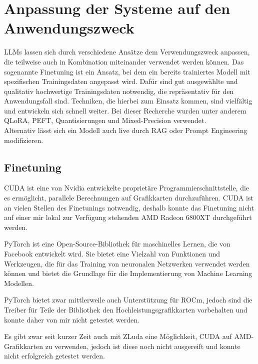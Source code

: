 \documentclass[german,report]{i1thesis}
\begin{document}
\newpage
\section{Anpassung der Systeme auf den Anwendungszweck}%
\label{sec:anpassungen-systeme}

\acp{LLM} lassen sich durch verschiedene Ansätze dem Verwendungszweck anpassen, die teilweise auch in Kombination miteinander verwendet werden können.
Das sogenannte Finetuning ist ein Ansatz, bei dem ein bereits trainiertes Modell mit spezifischen Trainingsdaten angepasst wird.
Dafür sind gut ausgewählte und qualitativ hochwertige Trainingsdaten notwendig, die repräsentativ für den Anwendungsfall sind.
Techniken, die hierbei zum Einsatz kommen, sind vielfältig und entwickeln sich schnell weiter.
Bei dieser Recherche wurden unter anderem \ac{QLoRA}, \ac{PEFT}, Quantisierungen und Mixed-Precision verwendet.\\

Alternativ lässt sich ein Modell auch live durch \ac{RAG} oder Prompt Engineering modifizieren.

\subsection{Finetuning}%
\label{subsec:Finetuning-cloud}

\ac{CUDA} ist eine von Nvidia entwickelte proprietäre Programmierschnittstelle, die es ermöglicht, parallele Berechnungen auf Grafikkarten durchzuführen.
\ac{CUDA} ist an vielen Stellen des Finetunings notwendig, deshalb konnte das Finetuning nicht auf einer mir lokal zur Verfügung stehenden AMD Radeon 6800XT durchgeführt werden.


PyTorch \autocite{pytorch} ist eine Open-Source-Bibliothek für maschinelles Lernen, die von Facebook entwickelt wird.
Sie bietet eine Vielzahl von Funktionen und Werkzeugen, die für das Training von neuronalen Netzwerken verwendet werden können und bietet die Grundlage für die Implementierung von Machine Learning Modellen.

PyTorch bietet zwar mittlerweile auch Unterstützung für  \ac{ROCm}, jedoch sind die Treiber für Teile der Bibliothek den Hochleistungsgrafikkarten vorbehalten und konnte daher von mir nicht getestet werden. \autocite{rocm-support}

Es gibt zwar seit kurzer Zeit auch mit ZLuda \autocite{zluda} eine Möglichkeit, \ac{CUDA} auf AMD-Grafikkarten zu verwenden, jedoch ist diese noch nicht ausgereift und konnte nicht erfolgreich getestet werden.
\end{document}
